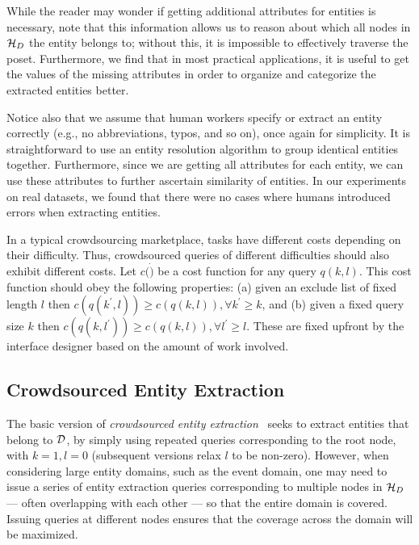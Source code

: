 While the reader may wonder if getting additional attributes for entities is necessary, note that this information allows us to reason about which all nodes in $\mathcal{H}_D$ the entity belongs to; without this, it is impossible to effectively traverse the poset. Furthermore, we find that in most practical applications, it is useful to get the values of the missing attributes in order to organize and categorize the extracted entities better. 

Notice also that we assume that human workers specify or extract an entity correctly (e.g., no abbreviations, typos, and so on), once again for simplicity. It is straightforward to use an entity resolution algorithm to group identical entities together. Furthermore, since we are getting all attributes for each entity, we can use these attributes to further ascertain similarity of entities. In our experiments on real datasets, we found that there were no cases where humans introduced errors when extracting entities. 

 In a typical crowdsourcing marketplace, tasks have different costs depending on their difficulty. Thus, crowdsourced queries of different difficulties should also exhibit different costs. Let $c(\dot)$ be a cost function for any query $q(k,l)$. This cost function should obey the following properties: (a) given an exclude list of fixed length $l$ then $c(q(k^{\prime},l)) \geq c(q(k,l)),  \forall k^{\prime} \geq k$, and (b) given a fixed query size $k$ then $c(q(k,l^{\prime})) \geq c(q(k,l)), \forall l^{\prime} \geq l$. These are fixed upfront by the interface designer based on the amount of work involved.

\subsection{Crowdsourced Entity Extraction}
\label{sec:extraction}


The basic version of {\em crowdsourced entity extraction}~\cite{trushkowsky:2013} seeks to extract entities that belong to $\mathcal{D}$, by simply using repeated queries corresponding to the root node, with $k = 1, l = 0$ (subsequent versions relax $l$ to be non-zero). However, when considering large entity domains, such as the event domain, one may need to issue a series of entity extraction queries corresponding to multiple nodes in  $\mathcal{H}_D$ --- often overlapping with each other --- so that the entire domain is covered. Issuing queries at different nodes ensures that the coverage across the domain will be maximized. 

